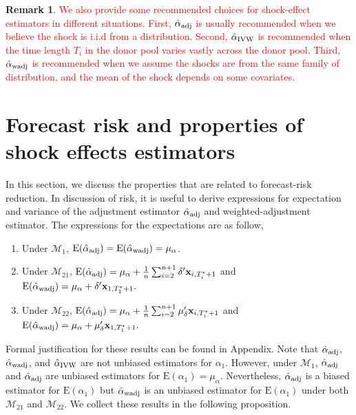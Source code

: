 \documentclass[11pt,3p,review,authoryear]{elsarticle}
\def\mbf#1{\mathbf{#1}} %
\def\mc#1{\mathcal{#1}} %
\def\E#1{\mathrm{E}(#1)} %
\theoremstyle{definition}
\newtheorem{remark}{Remark}
\begin{document}
\begin{remark}
  \textcolor{red}{We also provide some recommended choices for shock-effect estimators in different situations. First, $\hat{\alpha}_{\rm adj}$ is usually recommended when we believe the shock is i.i.d from a distribution. Second, $\hat{\alpha}_{\rm IVW}$ is recommended when the time length $T_i$ in the donor pool varies vastly across the donor pool. Third, $\hat{\alpha}_{\rm wadj}$  is recommended when we assume the shocks are from the same family of distribution, and the mean of the shock depends on some covariates.}
\end{remark}



\section{Forecast risk and properties of shock effects estimators}
\label{properties}

In this section, we discuss the properties that are related to forecast-risk reduction. In discussion of risk, it is useful to derive expressions for expectation and variance of the adjustment estimator $\hat{\alpha}_{\rm adj}$ and weighted-adjustment estimator.  The expressions for the expectations are as follow,

 \begin{enumerate}[label = (\roman*)]
    \item Under $\mc{M}_{1}$, $\E{\hat{\alpha}_{\rm adj}}=\E{\hat{\alpha}_{\rm wadj}} = \mu_{\alpha}$.
    \item Under $\mc{M}_{21}$, 
    $
      \E{\hat{\alpha}_{\rm adj}} = \mu_{\alpha} + \frac{1}{n} \sum_{i=2}^{n+1} \delta' \mbf{x}_{i, T_i^*+1}
    $
    and
    $
       \E{\hat{\alpha}_{\rm wadj}} = \mu_{\alpha} + \delta'\mbf{x}_{1, T_1^*+1} .
    $
    \item Under $\mc{M}_{22}$,
    $
      \E{\hat{\alpha}_{\rm adj}} = \mu_{\alpha} + \frac{1}{n} \sum_{i=2}^{n+1} \mu_{\delta}' \mbf{x}_{i, T_i^*+1}
    $
    and
    $
       \E{\hat{\alpha}_{\rm wadj}} = \mu_{\alpha} + \mu_{\delta}'\mbf{x}_{1, T_1^*+1} .
    $
  \end{enumerate}
Formal justification for these results can be found in Appendix. Note that $\hat{\alpha}_{\rm adj}$, $\hat{\alpha}_{\rm wadj}$, and $\hat{\alpha}_{\rm IVW}$ are not unbiased estimators for $\alpha_1$. However, under $\mc{M}_{1}$, $\hat{\alpha}_{\rm adj}$ and $\hat{\alpha}_{\rm adj}$ are unbiased estimators for $\E{\alpha_1}=\mu_{\alpha}$. Nevertheless, $\hat{\alpha}_{\rm adj}$ is a biased estimator for $\E{\alpha_1}$ but $\hat{\alpha}_{\rm wadj}$ is an unbiased estimator for $\E{\alpha_1}$ under both $\mc{M}_{21}$ and $\mc{M}_{22}$. We collect these results in the following proposition. 
\end{document}
